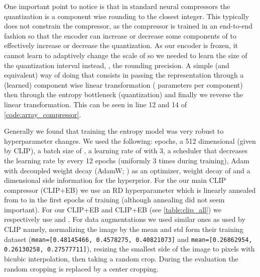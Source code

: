 \documentclass[final]{article}
\begin{document}
One important point to notice is that in standard neural compressors the quantization is  a component wise rounding to the closest integer.
This typically does not constrain the compressor, as the compressor is trained in an end-to-end fashion so that the encoder can increase or decrease some components of  to effectively increase or decrease the quantization.
As our encoder is frozen, it cannot learn to adaptively change the scale of  so we needed to learn the size of the quantization interval instead, \ie, the rounding precision.
A simple (and equivalent) way of doing that consists in passing the representation through a (learned) component wise linear transformation ( parameters per component) then through the entropy bottleneck (quantization) and finally we reverse the linear transformation.
This can be seen in line 12 and 14 of \cref{code:array_compressor}.

Generally we found that training the entropy model was very robust to hyperparameter changes. 
We used the following:  epochs, a 512 dimensional  (given by CLIP), a batch size of , a learning rate of  with 3, a  scheduler that decreases the learning rate by  every 12 epochs (\ie uniformly 3 times during training), Adam with decoupled weight decay (AdamW; \cite{loshchilov_decoupled_2019}) as an optimizer, weight decay of  and a  dimensional side information for the hyperprior.
For the our main CLIP compressor (CLIP+EB) we use an RD hyperparameter  which is linearly annealed from  to  in the first  epochs of training (although annealing did not seem important).
For our CLIP+EB\textsuperscript{} and CLIP+EB\textsuperscript{} (see \cref{table:clip_all}) we respectively use  and .
For data augmentations we used similar ones as used by CLIP namely, normalizing the image by the mean and std form their training dataset (\texttt{mean=[0.48145466, 0.4578275, 0.40821073]} and \texttt{mean=[0.26862954, 0.26130258, 0.27577711]}), resizing the smallest side of the image to  pixels with bicubic interpolation, then taking a random  crop.
During the evaluation the random cropping is replaced by a center cropping.
\end{document}

